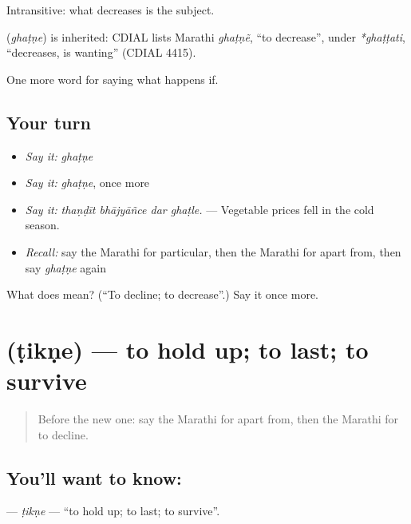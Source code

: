 Intransitive: what decreases is the subject.

\begin{cousinweb}
\textbf{} (\emph{ghaṭṇe}) is inherited: CDIAL lists Marathi \emph{ghaṭṇẽ}, \textquotedblleft{}to decrease\textquotedblright{}, under \emph{*ghaṭṭati}, \textquotedblleft{}decreases, is wanting\textquotedblright{} (CDIAL 4415).
\end{cousinweb}

\begin{grammarlens}[title={What you've built}]
One more word for saying what happens if.
\end{grammarlens}

\subsection*{Your turn}
\begin{itemize}
\raggedright
  \item \emph{Say it:} \emph{ghaṭṇe}
  \item \emph{Say it:} \emph{ghaṭṇe}, once more
  \item \emph{Say it:} \emph{thaṇḍīt bhājyāñce dar ghaṭle.} — Vegetable prices fell in the cold season.
  \item \emph{Recall:} say the Marathi for particular, then the Marathi for apart from, then say \emph{ghaṭṇe} again
\end{itemize}

\begin{tcolorbox}[breakable,colback=teal!4,colframe=teal!35!black,title={Before you move on}]
What does  mean? (\textquotedblleft{}To decline; to decrease\textquotedblright{}.) Say it once more.
\end{tcolorbox}
\section[\texorpdfstring{\mr{टिकणे} (ṭikṇe)}{टिकणे (ṭikṇe)}]{ (ṭikṇe) — to hold up; to last; to survive}

\label{lesson:MR-C391-tikne}



\begin{quote}
Before the new one: say the Marathi for apart from, then the Marathi for to decline.
\end{quote}

\subsection*{You'll want to know: }
\textbf{} — \emph{ṭikṇe} — \textquotedblleft{}to hold up; to last; to survive\textquotedblright{}.

